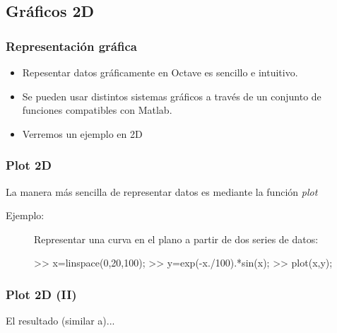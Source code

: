 
\subsection{Gráficos 2D}


\begin{frame}\frametitle{Representación gráfica}
\begin{itemize}
\item {} 
Repesentar datos gráficamente en Octave es sencillo e intuitivo.
\item  
  Se pueden usar distintos sistemas gráficos a través de un conjunto de funciones compatibles con Matlab.
\item Verremos un ejemplo en 2D
\end{itemize}

\end{frame}


\begin{frame}[containsverbatim]
\frametitle{Plot 2D}

La manera más sencilla de representar datos es mediante la función
\emph{plot}
\begin{description}
\item [Ejemplo:]
Representar una curva en el plano a partir de dos series de
datos:
\begin{Octave}
>> x=linspace(0,20,100); 
>> y=exp(-x./100).*sin(x);
>> plot(x,y);
\end{Octave}
\end{description}
\end{frame}


\begin{frame}\frametitle{Plot 2D (II)}

El resultado (similar a)...
\begin{figure}[htbp]\begin{center}
\end{center}\end{figure}

\end{frame}




